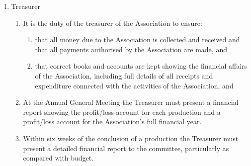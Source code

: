 \documentclass{article}
\begin{document}
\begin{enumerate}
\begin{enumerate}
    \end{enumerate}
  \item Treasurer
    \begin{enumerate}
      \item It is the duty of the treasurer of the Association to ensure:
      \begin{enumerate}
        \item that all money due to the Association is collected and received and that all payments authorised by the Association are made, and
        \item that correct books and accounts are kept showing the financial affairs of the Association, including full details of all receipts and expenditure connected with the activities of the Association, and
      \end{enumerate}
    \item At the Annual General Meeting the Treasurer must present a financial report showing the profit/loss account for each production and a profit/loss account for the Association’s full financial year.
    \item Within six weeks of the conclusion of a production the Treasurer must present a detailed financial report to the committee, particularly as compared with budget.
    \end{enumerate}
\end{enumerate}
\end{document}
